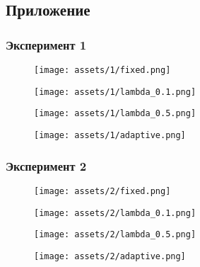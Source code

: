 \pagebreak

\subsection{Приложение}

\subsubsection{Эксперимент 1}
\begin{figure}[h!]
    \centering
    \texttt{[image: assets/1/fixed.png]}
    \label{exp1:fixed}
\end{figure}
\begin{figure}[h!]
    \centering
    \texttt{[image: assets/1/lambda\_0.1.png]}
    \label{exp1:lambda_0.1}
\end{figure}
\begin{figure}[h!]
    \centering
    \texttt{[image: assets/1/lambda\_0.5.png]}
    \label{exp1:lambda_0.5}
\end{figure}
\begin{figure}[h!]
    \centering
    \texttt{[image: assets/1/adaptive.png]}
    \label{exp1:adaptive}
\end{figure}
\pagebreak
\subsubsection{Эксперимент 2}
\begin{figure}[h!]
    \centering
    \texttt{[image: assets/2/fixed.png]}
    \label{exp2:fixed}
\end{figure}
\begin{figure}[h!]
    \centering
    \texttt{[image: assets/2/lambda\_0.1.png]}
    \label{exp2:lambda_0.1}
\end{figure}
\begin{figure}[h!]
    \centering
    \texttt{[image: assets/2/lambda\_0.5.png]}
    \label{exp2:lambda_0.5}
\end{figure}
\begin{figure}[h!]
    \centering
    \texttt{[image: assets/2/adaptive.png]}
    \label{exp2:adaptive}
\end{figure}
\pagebreak
